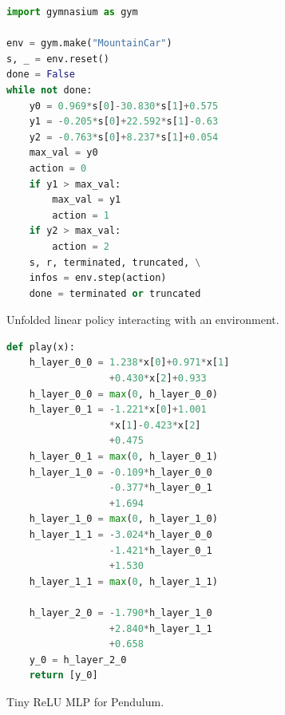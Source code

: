 \begin{figure}
\centering
\begin{minipage}{0.487\textwidth}
\begin{tcolorbox}
\begin{lstlisting}[language=Python]
import gymnasium as gym

env = gym.make("MountainCar")
s, _ = env.reset()
done = False
while not done:
    y0 = 0.969*s[0]-30.830*s[1]+0.575
    y1 = -0.205*s[0]+22.592*s[1]-0.63
    y2 = -0.763*s[0]+8.237*s[1]+0.054
    max_val = y0
    action = 0
    if y1 > max_val:
        max_val = y1
        action = 1
    if y2 > max_val:
        action = 2
    s, r, terminated, truncated, \
    infos = env.step(action)
    done = terminated or truncated
\end{lstlisting}
\end{tcolorbox}
\caption{Unfolded linear policy interacting with an environment.}\label{lst:unfolded-linear}
\end{minipage}
\hfill
\begin{minipage}{0.505\textwidth}
\begin{tcolorbox}
\begin{lstlisting}[language=Python]
def play(x):
    h_layer_0_0 = 1.238*x[0]+0.971*x[1]
                  +0.430*x[2]+0.933
    h_layer_0_0 = max(0, h_layer_0_0)
    h_layer_0_1 = -1.221*x[0]+1.001
                  *x[1]-0.423*x[2]
                  +0.475
    h_layer_0_1 = max(0, h_layer_0_1)
    h_layer_1_0 = -0.109*h_layer_0_0
                  -0.377*h_layer_0_1
                  +1.694
    h_layer_1_0 = max(0, h_layer_1_0)
    h_layer_1_1 = -3.024*h_layer_0_0
                  -1.421*h_layer_0_1
                  +1.530
    h_layer_1_1 = max(0, h_layer_1_1)

    h_layer_2_0 = -1.790*h_layer_1_0
                  +2.840*h_layer_1_1
                  +0.658
    y_0 = h_layer_2_0
    return [y_0]
\end{lstlisting}
\end{tcolorbox}
\caption{Tiny ReLU MLP for Pendulum.}\label{lst:generic-linear}
\end{minipage}
\end{figure}

